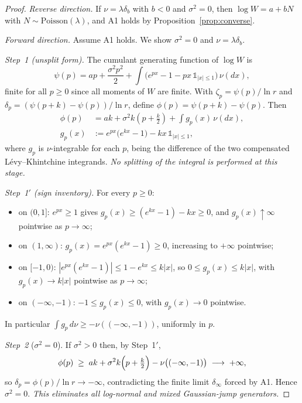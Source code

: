\documentclass[12pt]{amsart}
\theoremstyle{definition}
\theoremstyle{remark}
\begin{document}
\begin{proof}
\textit{Reverse direction.} If $\nu = \lambda\delta_b$ with $b < 0$
and $\sigma^2 = 0$, then $\log W = a + bN$ with $N \sim
\mathrm{Poisson}(\lambda)$, and A1 holds by
Proposition~\ref{prop:converse}.

\textit{Forward direction.}  Assume A1 holds.  We show $\sigma^2 = 0$
and $\nu = \lambda\delta_b$.

\textit{Step~1 (unsplit form).}  The cumulant generating function of
$\log W$ is
\[
  \psi(p) = ap + \frac{\sigma^2 p^2}{2}
  + \int\bigl(e^{px} - 1 - px\,\mathds{1}_{|x|\leq 1}\bigr)
  \,\nu(dx),
\]
finite for all $p \ge 0$ since all moments of $W$ are finite.  With
$\zeta_p = \psi(p)/\ln r$ and $\delta_p = (\psi(p+k) -
\psi(p))/\ln r$, define $\phi(p) = \psi(p+k) - \psi(p)$.  Then
\[
\begin{aligned}
  \phi(p) &= ak + \sigma^2 k\!\left(p + \tfrac{k}{2}\right)
  + \int g_p(x)\,\nu(dx),\\
  g_p(x) &:= e^{px}\bigl(e^{kx}-1\bigr) - kx\,\mathds{1}_{|x|\leq 1},
\end{aligned}
\]
where $g_p$ is $\nu$-integrable for each $p$, being the difference of
the two compensated L\'evy--Khintchine integrands.  \emph{No
splitting of the integral is performed at this stage.}

\textit{Step~1$'$ (sign inventory).}  For every $p \ge 0$:
\begin{itemize}
\item on $(0,1]$: $e^{px} \ge 1$ gives $g_p(x) \ge (e^{kx}-1) - kx
  \ge 0$, and $g_p(x) \uparrow \infty$ pointwise as $p \to \infty$;
\item on $(1,\infty)$: $g_p(x) = e^{px}(e^{kx}-1) \ge 0$, increasing
  to $+\infty$ pointwise;
\item on $[-1,0)$: $|e^{px}(e^{kx}-1)| \le 1 - e^{kx} \le k|x|$, so
  $0 \le g_p(x) \le k|x|$, with $g_p(x) \to k|x|$ pointwise as
  $p \to \infty$;
\item on $(-\infty,-1)$: $-1 \le g_p(x) \le 0$, with $g_p(x) \to 0$
  pointwise.
\end{itemize}
In particular $\int g_p\,d\nu \ge -\nu((-\infty,-1))$, uniformly in
$p$.

\textit{Step~2} ($\sigma^2 = 0$).  If $\sigma^2 > 0$ then, by
Step~1$'$,
\[
  \phi(p) \;\ge\; ak + \sigma^2 k\Bigl(p + \tfrac{k}{2}\Bigr)
  - \nu\bigl((-\infty,-1)\bigr) \;\longrightarrow\; +\infty,
\]
so $\delta_p = \phi(p)/\ln r \to -\infty$, contradicting the finite
limit $\delta_\infty$ forced by A1.  Hence $\sigma^2 = 0$.
\textit{This eliminates all log-normal and mixed Gaussian-jump
generators.}


\end{proof}
\end{document}
